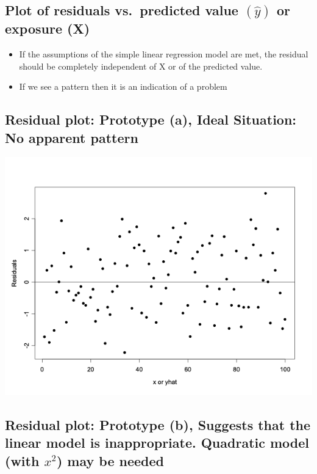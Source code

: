 \documentclass[
]{book}
\providecommand{\tightlist}{%
  \setlength{\itemsep}{0pt}\setlength{\parskip}{0pt}}
\begin{document}
\hypertarget{plot-of-residuals-vs.-predicted-value-haty-or-exposure-x}{%
\subsection{\texorpdfstring{Plot of residuals vs.~predicted value \((\hat{y})\) or exposure (X)}{Plot of residuals vs.~predicted value (\textbackslash hat\{y\}) or exposure (X)}}\label{plot-of-residuals-vs.-predicted-value-haty-or-exposure-x}}

\begin{itemize}
\tightlist
\item
  If the assumptions of the simple linear regression model are met, the residual should be completely independent of X or of the predicted value.
\item
  If we see a pattern then it is an indication of a problem
\end{itemize}

\hypertarget{residual-plot-prototype-a-ideal-situation-no-apparent-pattern}{%
\subsection{Residual plot: Prototype (a), Ideal Situation: No apparent pattern}\label{residual-plot-prototype-a-ideal-situation-no-apparent-pattern}}

\includegraphics[width=1\linewidth]{./12_41}

\hypertarget{residual-plot-prototype-b-suggests-that-the-linear-model-is-inappropriate.-quadratic-model-with-x2-may-be-needed}{%
\subsection{\texorpdfstring{Residual plot: Prototype (b), Suggests that the linear model is inappropriate. Quadratic model (with \(x^2\)) may be needed}{Residual plot: Prototype (b), Suggests that the linear model is inappropriate. Quadratic model (with x\^{}2) may be needed}}\label{residual-plot-prototype-b-suggests-that-the-linear-model-is-inappropriate.-quadratic-model-with-x2-may-be-needed}}
\end{document}
